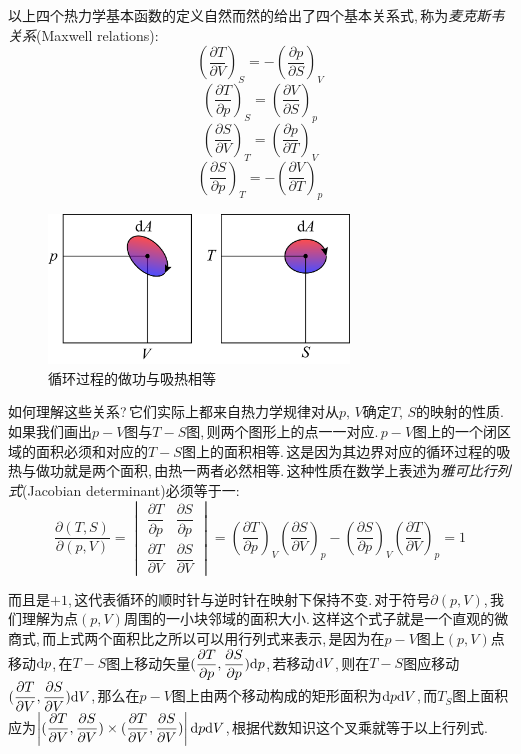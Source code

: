 \npg{-2cm}
以上四个热力学基本函数的定义自然而然的给出了四个基本关系式,\,称为\emph{麦克斯韦关系}(Maxwell relations):
\[\left(\frac{\partial T}{\partial V}\right)_S=-\left(\frac{\partial p}{\partial S}\right)_V\]
\[\left(\frac{\partial T}{\partial p}\right)_S=\left(\frac{\partial V}{\partial S}\right)_p\]
\[\left(\frac{\partial S}{\partial V}\right)_T=\left(\frac{\partial p}{\partial T}\right)_V\]
\[\left(\frac{\partial S}{\partial p}\right)_T=-\left(\frac{\partial V}{\partial T}\right)_p\]

\begin{figure}
\centering
\vspace{-0.3cm}
\includegraphics[width=8cm]{image/5-2-17.png}
\caption{循环过程的做功与吸热相等}
\end{figure}
如何理解这些关系?\,它们实际上都来自热力学规律对从$p,\,V$确定$T,\,S$的映射的性质.\,如果我们画出$p-V$图与$T-S$图,\,则两个图形上的点一一对应.\,$p-V$图上的一个闭区域的面积必须和对应的$T-S$图上的面积相等.\,这是因为其边界对应的循环过程的吸热与做功就是两个面积,\,由热一两者必然相等.\,这种性质在数学上表述为\emph{雅可比行列式}(Jacobian determinant)必须等于一:
\[\frac{\partial(T,S)}{\partial(p,V)}=\begin{vmatrix}\dfrac{\partial T}{\partial p} & \dfrac{\partial S}{\partial p} \\[8pt] \dfrac{\partial T}{\partial V} & \dfrac{\partial S}{\partial V}\end{vmatrix}=\left(\frac{\partial T}{\partial p}\right)_V\left(\frac{\partial S}{\partial V}\right)_p-\left(\frac{\partial S}{\partial p}\right)_V\left(\frac{\partial T}{\partial V}\right)_p=1\]

而且是$+1$,\,这代表循环的顺时针与逆时针在映射下保持不变.\,对于符号$\partial(p,V)$,\,我们理解为点$(p,V)$周围的一小块邻域的面积大小.\,这样这个式子就是一个直观的微商式,\,而上式两个面积比之所以可以用行列式来表示,\,是因为在$p-V$图上$(p,V)$点移动$\textrm{d} p$,\,在$T-S$图上移动矢量$(\dfrac{\partial T}{\partial p},\dfrac{\partial S}{\partial p})\textrm{d} p$,\,若移动$\textrm{d} V$,\,则在$T-S$图应移动$(\dfrac{\partial T}{\partial V},\dfrac{\partial S}{\partial V})\textrm{d} V$,\,那么在$p-V$图上由两个移动构成的矩形面积为$\textrm{d} p\textrm{d} V$,\,而$T_S$图上面积应为$\left|(\dfrac{\partial T}{\partial V},\dfrac{\partial S}{\partial V})\times(\dfrac{\partial T}{\partial V},\dfrac{\partial S}{\partial V})\right|\textrm{d} p\textrm{d} V$,\,根据代数知识这个叉乘就等于以上行列式.

